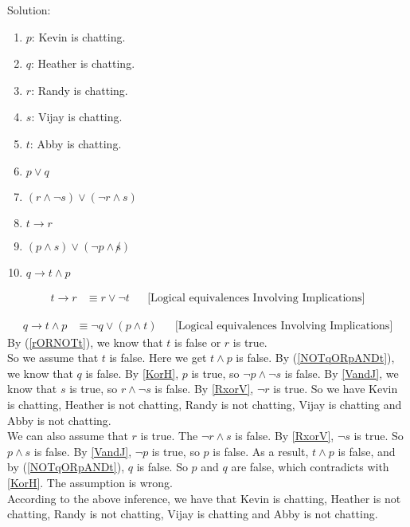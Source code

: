 \documentclass[12pt]{article}
\begin{document}
\indent Solution:\\
\begin{enumerate}
\item \label{Kchat} $p$: Kevin is chatting.
\item \label{Hchat} $q$: Heather is chatting.
\item \label{Rchat} $r$: Randy is chatting.
\item \label{Vchat} $s$: Vijay is chatting.
\item \label{Achat} $t$: Abby is chatting.
\item \label{KorH} $p \lor q$
\item \label{RxorV} $(r \land \lnot s) \lor (\lnot r \land s)$
\item \label{AimpliesR} $t \to r$
\item \label{VandJ} $(p \land s) \lor (\lnot p \land \not s)$
\item \label{HimpAandK} $q \to t \land p$
\end{enumerate}

\begin{align}
\label{rORNOTt}
t \to r & \equiv r \lor \lnot t && \text{[Logical equivalences Involving Implications]} 
\end{align}

\begin{align}
\label{NOTqORpANDt}
q \to t \land p &\equiv \lnot q \lor (p \land t) && \text{[Logical equivalences Involving Implications]}
\end{align}
\indent By (\ref{rORNOTt}), we know that $t$ is false or $r$ is true. \\ 
\indent So we assume that $t$ is false. Here we get $t \land p$ is false. By (\ref{NOTqORpANDt}), we know that $q$ is false. By \ref{KorH}, $p$ is true, so $\lnot p \land \lnot s$ is false. By \ref{VandJ}, we know that $s$ is true, so $r \land \lnot s$ is false. By \ref{RxorV}, $\lnot r$ is true. So we have Kevin is chatting, Heather is not chatting, Randy is not chatting, Vijay is chatting and Abby is not chatting.\\ 
\indent We can also assume that $r$ is true. The $\lnot r \land s$ is false. By \ref{RxorV}, $\lnot s$ is true. So $p \land s$ is false. By \ref{VandJ}, $\lnot p$ is true, so $p$ is false. As a result, $t \land p$ is false, and by (\ref{NOTqORpANDt}), $q$ is false. So $p$ and $q$ are false, which contradicts with \ref{KorH}. The assumption is wrong.\\
\indent According to the above inference, we have that Kevin is chatting, Heather is not chatting, Randy is not chatting, Vijay is chatting and Abby is not chatting.
\newpage
\end{document}
